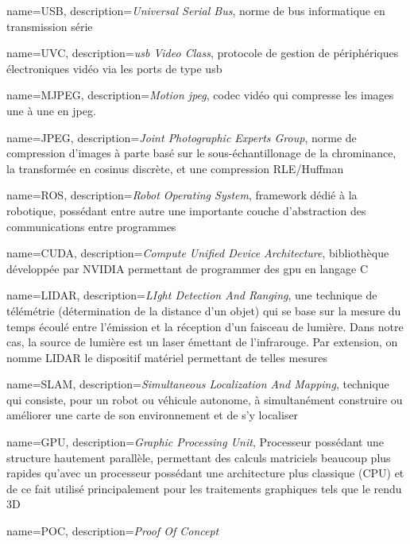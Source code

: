 \makeglossaries

{
	name={USB},
	description={\emph{Universal Serial Bus}, norme de bus informatique en transmission série}
}

{
	name={UVC},
	description={\emph{\gls{usb} Video Class}, protocole de gestion de périphériques électroniques vidéo via les ports de type \gls{usb}}
}

{
	name={MJPEG},
	description={\emph{Motion \gls{jpeg}}, codec vidéo qui compresse les images une à une en \gls{jpeg}.}
}

{
	name={JPEG},
	description={\emph{Joint Photographic Experts Group}, norme de compression d'images à parte basé sur le sous-échantillonage de la chrominance, la transformée en cosinus discrète, et une compression RLE/Huffman}
}

{
	name={ROS},
	description={\emph{Robot Operating System}, framework dédié à la robotique, possédant entre autre une importante couche d'abstraction des communications entre programmes}
}

{
	name={CUDA},
	description={\emph{Compute Unified Device Architecture}, bibliothèque développée par NVIDIA permettant de programmer des \gls{gpu} en langage C}
}


{
	name={LIDAR},
	description={\emph{LIght Detection And Ranging}, une technique de télémétrie (détermination de la distance d'un objet) qui se base sur la mesure du temps écoulé entre l'émission et la réception d'un faisceau de lumière. Dans notre cas, la source de lumière est un laser émettant de l'infrarouge. Par extension, on nomme LIDAR le dispositif matériel permettant de telles mesures}
}

{
	name={SLAM},
	description={\emph{Simultaneous Localization And Mapping}, technique qui consiste, pour un robot ou véhicule autonome, à simultanément construire ou améliorer une carte de son environnement et de s’y localiser}
}

{
	name={GPU},
	description={\emph{Graphic Processing Unit}, Processeur possédant une structure hautement parallèle, permettant des calculs matriciels beaucoup plus rapides qu'avec un processeur possédant une architecture plus classique (CPU) et de ce fait utilisé principalement pour les traitements graphiques tels que le rendu 3D}
}

{
	name={POC},
	description={\emph{Proof Of Concept}}
}

